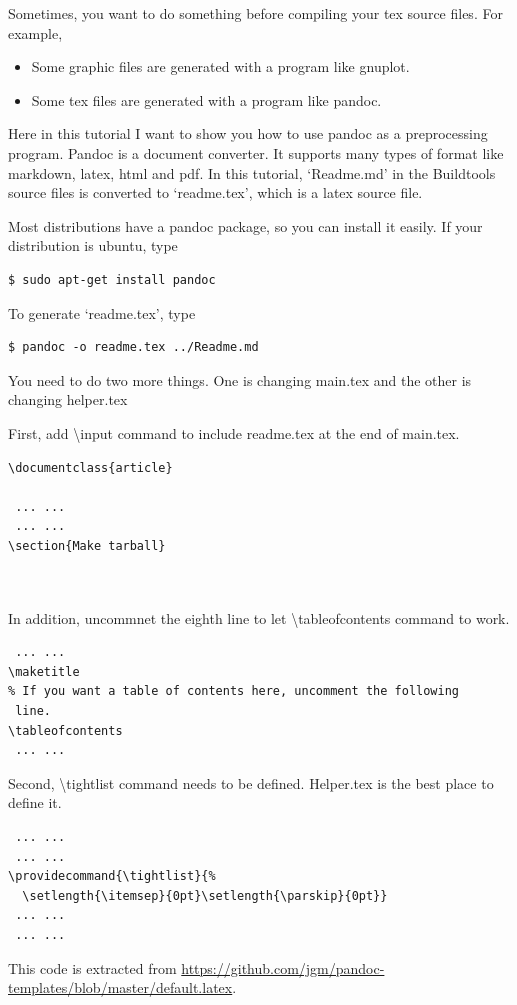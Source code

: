 Sometimes, you want to do something before compiling your tex source files.
For example,
\begin{itemize}
\item Some graphic files are generated with a program like gnuplot.
\item Some tex files are generated with a program like pandoc.
\end{itemize}

Here in this tutorial I want to show you how to use pandoc as a preprocessing program.
Pandoc is a document converter.
It supports many types of format like markdown, latex, html and pdf.
In this tutorial, `Readme.md' in the Buildtools source files is converted to `readme.tex', which is a latex source file.

Most distributions have a pandoc package, so you can install it easily.
If your distribution is ubuntu, type
\begin{verbatim}
$ sudo apt-get install pandoc
\end{verbatim}

To generate `readme.tex', type
\begin{verbatim}
$ pandoc -o readme.tex ../Readme.md
\end{verbatim}

You need to do two more things.
One is changing main.tex and the other is changing helper.tex

First, add {\textbackslash}input command to include readme.tex at the end of main.tex.
\begin{verbatim}
\documentclass{article}

 ... ...
 ... ...
\section{Make tarball}
  


\end{verbatim}
In addition, uncommnet the eighth line to let {\textbackslash}tableofcontents command to work.
\begin{verbatim}
 ... ...
\maketitle
% If you want a table of contents here, uncomment the following
 line.
\tableofcontents
 ... ...
\end{verbatim}

Second, {\textbackslash}tightlist command needs to be defined.
Helper.tex is the best place to define it.
\begin{verbatim}
 ... ...
 ... ...
\providecommand{\tightlist}{%
  \setlength{\itemsep}{0pt}\setlength{\parskip}{0pt}}
 ... ...
 ... ...
\end{verbatim}
This code is extracted from \url{https://github.com/jgm/pandoc-templates/blob/master/default.latex}.

